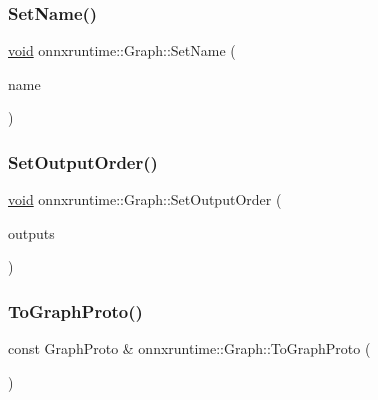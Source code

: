 \mbox{\label{classonnxruntime_1_1Graph_aefeff3396d82aee4254a1ed21dc6469a}} 
\subsubsection{\texorpdfstring{Set\+Name()}{SetName()}}
{\footnotesize\ttfamily \mbox{\hyperlink{mlasi_8h_a88f941d423cb2a819b70a1358982b1a6}{void}} onnxruntime\+::\+Graph\+::\+Set\+Name (\begin{DoxyParamCaption}\item[{const std\+::string \&}]{name }\end{DoxyParamCaption})}

\mbox{\label{classonnxruntime_1_1Graph_a43c500bf62610e0ac533f86410e0f7d2}} 
\subsubsection{\texorpdfstring{Set\+Output\+Order()}{SetOutputOrder()}}
{\footnotesize\ttfamily \mbox{\hyperlink{mlasi_8h_a88f941d423cb2a819b70a1358982b1a6}{void}} onnxruntime\+::\+Graph\+::\+Set\+Output\+Order (\begin{DoxyParamCaption}\item[{const std\+::vector$<$ const \mbox{\hyperlink{classonnxruntime_1_1NodeArg}{Node\+Arg}} $\ast$$>$}]{outputs }\end{DoxyParamCaption})\hspace{0.3cm}{\ttfamily [inline]}}

\mbox{\label{classonnxruntime_1_1Graph_a9fdaa2f3924b5b06a2a6cda0821d9d6a}} 
\subsubsection{\texorpdfstring{To\+Graph\+Proto()}{ToGraphProto()}}
{\footnotesize\ttfamily const Graph\+Proto \& onnxruntime\+::\+Graph\+::\+To\+Graph\+Proto (\begin{DoxyParamCaption}{ }\end{DoxyParamCaption})}



